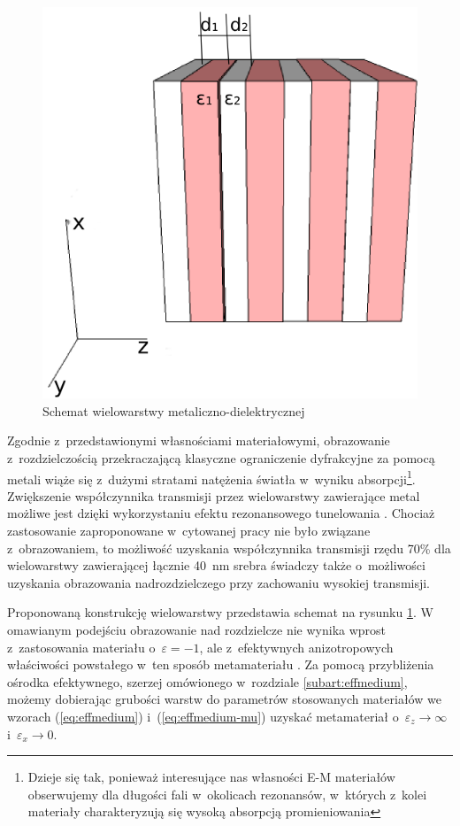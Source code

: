 \begin{figure}[tbh]
	\centering
	\includegraphics[width=.5\textwidth]{images/multilayer/multilayer-3d.png}
	\caption{Schemat wielowarstwy metaliczno-dielektrycznej}
	\label{fig:mulschem}
\end{figure}


Zgodnie z~przedstawionymi własnościami materiałowymi, obrazowanie z~rozdzielczością przekraczającą klasyczne ograniczenie dyfrakcyjne za pomocą metali wiąże się z~dużymi stratami natężenia światła w~wyniku absorpcji\footnote{Dzieje się tak, ponieważ interesujące nas własności E-M materiałów obserwujemy dla długości fali w~okolicach rezonansów, w~których z~kolei materiały charakteryzują się wysoką absorpcją promieniowania}. Zwiększenie współczynnika transmisji przez wielowarstwy zawierające metal możliwe jest dzięki wykorzystaniu efektu rezonansowego tunelowania \cite{scalora-transparentmetal}. Chociaż zastosowanie zaproponowane w~cytowanej pracy nie było związane z~obrazowaniem, to możliwość uzyskania współczynnika transmisji rzędu 70\% dla wielowarstwy zawierającej łącznie 40~nm srebra świadczy także o~możliwości uzyskania obrazowania nadrozdzielczego przy zachowaniu wysokiej transmisji. 

Proponowaną konstrukcję wielowarstwy przedstawia schemat na rysunku \ref{fig:mulschem}. W omawianym podejściu obrazowanie nad rozdzielcze nie wynika wprost z~zastosowania materiału o~$\varepsilon = -1$, ale z~efektywnych anizotropowych właściwości powstałego w~ten sposób  metamateriału \cite{ramakrishna2003imaging}. Za pomocą przybliżenia ośrodka efektywnego, szerzej omówionego w~rozdziale \ref{subart:effmedium}, możemy dobierając grubości warstw do parametrów stosowanych materiałów we wzorach (\ref{eq:effmedium}) i~(\ref{eq:effmedium-mu})  uzyskać metamateriał o~$\varepsilon_z \to \infty$ i~$\varepsilon_x \to 0$.



